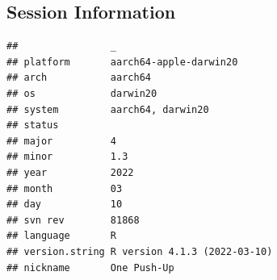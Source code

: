 \documentclass[9pt,lineno]{elife}
\begin{document}
\setcounter{table}{0}  \renewcommand{\thetable}{S\arabic{table}} \setcounter{figure}{0} \renewcommand{\thefigure}{S\arabic{figure}}

\hypertarget{session-information}{%
\subsection{Session Information}\label{session-information}}

\begin{verbatim}
##                _                           
## platform       aarch64-apple-darwin20      
## arch           aarch64                     
## os             darwin20                    
## system         aarch64, darwin20           
## status                                     
## major          4                           
## minor          1.3                         
## year           2022                        
## month          03                          
## day            10                          
## svn rev        81868                       
## language       R                           
## version.string R version 4.1.3 (2022-03-10)
## nickname       One Push-Up
\end{verbatim}
\end{document}
